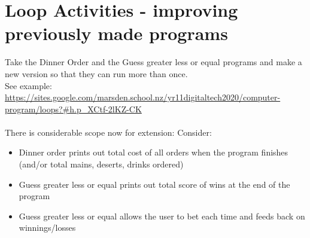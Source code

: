 \documentclass[a4paper,12pt]{article}
\begin{document}
\section{Loop Activities - improving previously made programs}
Take the Dinner Order and the Guess greater less or equal programs  and make a new version so that they can run more than once.\\
See example: \url{https://sites.google.com/marsden.school.nz/yr11digitaltech2020/computer-program/loops?#h.p_XCtf-2lKZ-CK}\\\\
There is considerable scope now for extension:
Consider:
\begin{itemize}
\item Dinner order prints out total cost of all orders when the program finishes (and/or total mains, deserts, drinks ordered)
\item Guess greater less or equal prints out total score of wins at the end of the program
\item Guess greater less or equal allows the user to bet each time and feeds back on winnings/losses
\end{itemize}
\end{document}

